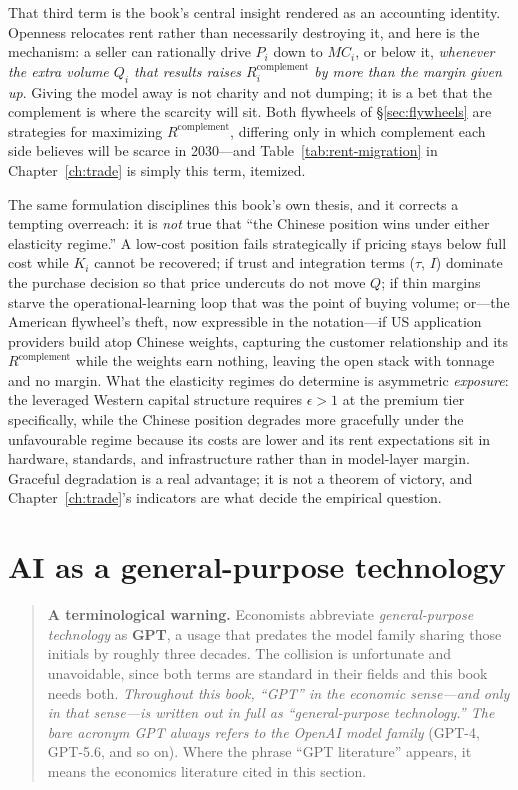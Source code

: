 That third term is the book's central insight rendered as an accounting identity. Openness relocates rent rather than necessarily destroying it, and here is the mechanism: a seller can rationally drive $P_i$ down to $MC_i$, or below it, \emph{whenever the extra volume $Q_i$ that results raises $R_i^{\mathrm{complement}}$ by more than the margin given up}. Giving the model away is not charity and not dumping; it is a bet that the complement is where the scarcity will sit. Both flywheels of \S\ref{sec:flywheels} are strategies for maximizing $R^{\mathrm{complement}}$, differing only in which complement each side believes will be scarce in 2030---and Table~\ref{tab:rent-migration} in Chapter~\ref{ch:trade} is simply this term, itemized.

The same formulation disciplines this book's own thesis, and it corrects a tempting overreach: it is \emph{not} true that ``the Chinese position wins under either elasticity regime.'' A low-cost position fails strategically if pricing stays below full cost while $K_i$ cannot be recovered; if trust and integration terms ($\tau$, $I$) dominate the purchase decision so that price undercuts do not move $Q$; if thin margins starve the operational-learning loop that was the point of buying volume; or---the American flywheel's theft, now expressible in the notation---if US application providers build atop Chinese weights, capturing the customer relationship and its $R^{\mathrm{complement}}$ while the weights earn nothing, leaving the open stack with tonnage and no margin. What the elasticity regimes do determine is asymmetric \emph{exposure}: the leveraged Western capital structure requires $\epsilon>1$ at the premium tier specifically, while the Chinese position degrades more gracefully under the unfavourable regime because its costs are lower and its rent expectations sit in hardware, standards, and infrastructure rather than in model-layer margin. Graceful degradation is a real advantage; it is not a theorem of victory, and Chapter~\ref{ch:trade}'s indicators are what decide the empirical question.

\section{AI as a general-purpose technology}
\label{sec:gpt}

\begin{quote}\small
\textbf{A terminological warning.} Economists abbreviate \emph{general-purpose technology} as \textbf{GPT}, a usage that predates the model family sharing those initials by roughly three decades. The collision is unfortunate and unavoidable, since both terms are standard in their fields and this book needs both. \emph{Throughout this book, ``GPT'' in the economic sense---and only in that sense---is written out in full as ``general-purpose technology.'' The bare acronym GPT always refers to the OpenAI model family} (GPT-4, GPT-5.6, and so on). Where the phrase ``GPT literature'' appears, it means the economics literature cited in this section.
\end{quote}


